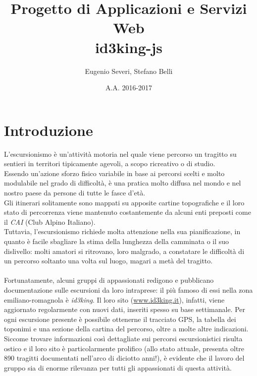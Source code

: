 \documentclass[11pt]{report}
\begin{document}
\title{Progetto di Applicazioni e Servizi Web\\id3king-js}
\author{Eugenio Severi, Stefano Belli}
\date{A.A. 2016-2017}
\begin{titlepage}
	\maketitle
\end{titlepage}

\setcounter{chapter}{1}
\section{Introduzione}
L'escursionismo è un'attività motoria nel quale viene percorso un tragitto su sentieri in territori tipicamente agevoli, a scopo ricreativo o di studio.
\\Essendo un'azione sforzo fisico variabile in base ai percorsi scelti e molto modulabile nel grado di difficoltà, è una pratica molto diffusa nel mondo e nel nostro paese da persone di tutte le fasce d'età.
\\Gli itinerari solitamente sono mappati su apposite cartine topografiche e il loro stato di percorrenza viene mantenuto costantemente da alcuni enti preposti come il \textit{CAI} (Club Alpino Italiano).
\\Tuttavia, l'escursionismo richiede molta attenzione nella sua pianificazione, in quanto è facile sbagliare la stima della lunghezza della camminata o il suo dislivello:
molti amatori si ritrovano, loro malgrado, a constatare le difficoltà di un percorso soltanto una volta sul luogo, magari a metà del tragitto.
\\\\Fortunatamente, alcuni gruppi di appassionati redigono e pubblicano documentazione sulle escursioni da loro intraprese: il più famoso di essi nella zona emiliano-romagnola è \textit{id3king}.
Il loro sito (\url{www.id3king.it}), infatti, viene aggiornato regolarmente con nuovi dati, inseriti spesso su base settimanale.
Per ogni escursione presente è possibile ottenerne il tracciato GPS, la tabella dei toponimi e una sezione della cartina del percorso, oltre a molte altre indicazioni.
\\Siccome trovare informazioni così dettagliate sui percorsi escursionistici risulta ostico e il loro sito è particolarmente prolifico (allo stato attuale, presenta oltre 890 tragitti documentati nell'arco di diciotto anni!), è evidente che il lavoro del gruppo sia di enorme rilevanza per tutti gli appassionati di questa attività.
\end{document}
